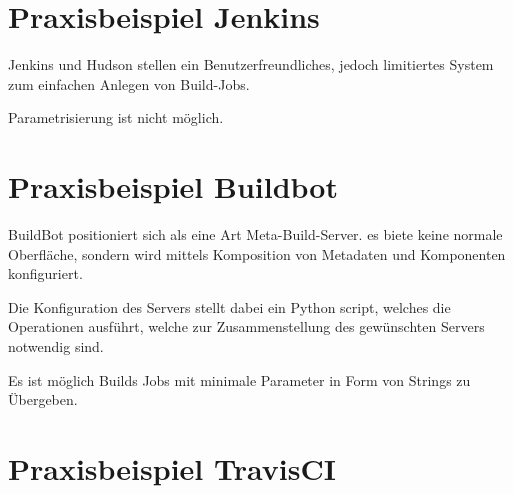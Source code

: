 \section{Praxisbeispiel Jenkins}

Jenkins und Hudson stellen ein Benutzerfreundliches,
jedoch limitiertes System zum einfachen Anlegen von Build-Jobs.

Parametrisierung ist nicht möglich.

\section{Praxisbeispiel Buildbot}

BuildBot positioniert sich als eine Art Meta-Build-Server.
es biete keine normale Oberfläche, sondern wird mittels
Komposition von Metadaten und Komponenten konfiguriert.

Die Konfiguration des Servers stellt dabei ein Python script,
welches die Operationen ausführt, welche zur Zusammenstellung des gewünschten Servers notwendig sind.

Es ist möglich Builds Jobs mit minimale Parameter in Form von Strings zu Übergeben.

\section{Praxisbeispiel TravisCI}


